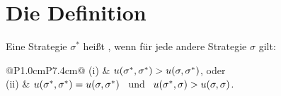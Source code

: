 \section{Die Definition}

\begin{definition}
Eine Strategie $\sigma^{*}$ heißt , wenn für jede andere Strategie $\sigma$ gilt:
\begin{center}
{\small
\renewcommand{\arraystretch}{1.55}
\begin{tabular}{@{}P{1.0cm}P{7.4cm}@{}}
\toprule
(i) & $u(\sigma^{*},\sigma^{*}) > u(\sigma,\sigma^{*})$, \quad oder\\
(ii) & $u(\sigma^{*},\sigma^{*}) = u(\sigma,\sigma^{*})$ \ und \ $u(\sigma^{*},\sigma) > u(\sigma,\sigma)$.\\
\bottomrule
\end{tabular}}
\end{center}
\end{definition}

